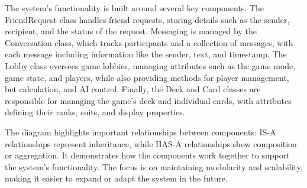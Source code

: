 \noindent The system’s functionality is built around several key components. The FriendRequest class handles friend requests, storing details such as the sender, recipient, and the status of the request. Messaging is managed by the Conversation class, which tracks participants and a collection of messages, with each message including information like the sender, text, and timestamp. The Lobby class oversees game lobbies, managing attributes such as the game mode, game state, and players, while also providing methods for player management, bet calculation, and AI control. Finally, the Deck and Card classes are responsible for managing the game’s deck and individual cards, with attributes defining their ranks, suits, and display properties.

\noindent The diagram highlights important relationships between components: IS-A relationships represent inheritance, while HAS-A relationships show composition or aggregation. It demonstrates how the components work together to support the system's functionality. The focus is on maintaining modularity and scalability, making it easier to expand or adapt the system in the future.
